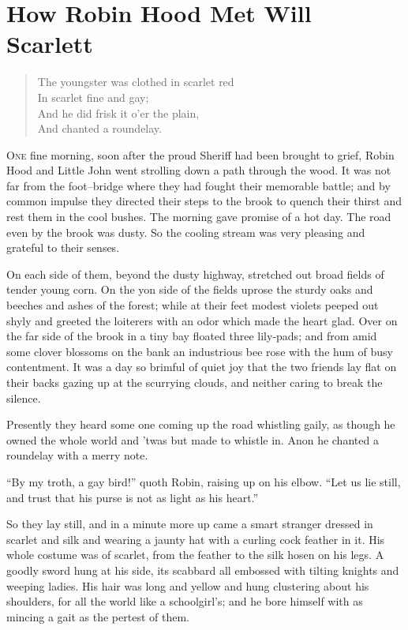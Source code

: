 \chapter{How Robin Hood Met Will Scarlett}

\begin{quote}
The youngster was clothed in scarlet red\\
In scarlet fine and gay;\\
And he did frisk it o'er the plain,\\
And chanted a roundelay.
\end{quote}

\lettrine{O}{ne} fine morning, soon after the proud Sheriff had been
brought to grief, Robin Hood and Little John went strolling down a path
through the wood. It was not far from the foot--bridge where they had
fought their memorable battle; and by common impulse they directed their
steps to the brook to quench their thirst and rest them in the cool
bushes. The morning gave promise of a hot day. The road even by the brook
was dusty. So the cooling stream was very pleasing and grateful to their
senses.

On each side of them, beyond the dusty highway, stretched out broad
fields of tender young corn. On the yon side of the fields uprose the
sturdy oaks and beeches and ashes of the forest; while at their feet
modest violets peeped out shyly and greeted the loiterers with an odor
which made the heart glad. Over on the far side of the brook in a tiny
bay floated three lily-pads; and from amid some clover blossoms on the
bank an industrious bee rose with the hum of busy contentment. It was a
day so brimful of quiet joy that the two friends lay flat on their backs
gazing up at the scurrying clouds, and neither caring to break the
silence.

Presently they heard some one coming up the road whistling gaily, as
though he owned the whole world and 'twas but made to whistle in. Anon
he chanted a roundelay with a merry note.

``By my troth, a gay bird!'' quoth Robin, raising up on his elbow. ``Let
us lie still, and trust that his purse is not as light as his heart.''

So they lay still, and in a minute more up came a smart stranger dressed
in scarlet and silk and wearing a jaunty hat with a curling cock feather
in it. His whole costume was of scarlet, from the feather to the silk
hosen on his legs. A goodly sword hung at his side, its scabbard all
embossed with tilting knights and weeping ladies. His hair was long and
yellow and hung clustering about his shoulders, for all the world like a
schoolgirl's; and he bore himself with as mincing a gait as the pertest
of them.

